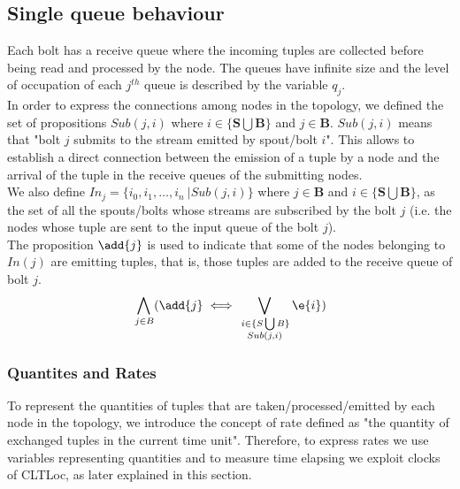 \subsection*{Single queue behaviour}

Each bolt has a receive queue where the incoming tuples are collected before being read and processed by the node.
The queues have infinite size and the level of occupation of each $j^{th}$ queue is described by the variable $q_j$.\\
In order to express the connections among nodes in the topology, we defined the set of propositions $Sub(j,i)$ where $i \in \{ \mathbf{S} \bigcup \mathbf{B}\}$ and $j \in \mathbf{B}$. $Sub(j,i)$ means that "bolt $j$ submits to the stream emitted by spout/bolt $i$". This allows to establish a direct connection between the emission of a tuple by a node and the arrival of the tuple in the receive queues of the submitting nodes.\\
We also define $In_j=\{i_0,i_1, \dots, i_n\ | Sub(j,i) \}$ where $j\in \mathbf{B}$ and $i \in \{ \mathbf{S}\bigcup\mathbf{B}\}$, as the set of all the spouts/bolts whose streams are subscribed by the bolt $j$ (i.e. the nodes whose tuple are sent to the input queue of the bolt $j$).\\
The proposition $\add{j}$ is used to indicate that some of the nodes belonging to $In(j)$ are emitting tuples, that is, those tuples are added to the receive queue of bolt $j$.
\begin{align*}
 \bigwedge_{
\begin{subarray}{c}
\,j \in B
\end{subarray}
} ( \add{j} \iff 
\bigvee_{
\begin{subarray}{c}
\,i \in \{S \bigcup B \}\\
Sub(j,i)
\end{subarray}
 } \e{i})
\end{align*}
\subsubsection*{Quantites and Rates}
To represent the quantities of tuples that are taken/processed/emitted by each node in the topology, we introduce the concept of rate defined as "the quantity of exchanged tuples  in the current time unit". 
Therefore, to express rates we use variables representing quantities and to measure time elapsing we exploit clocks of CLTLoc, as later explained in this section.

